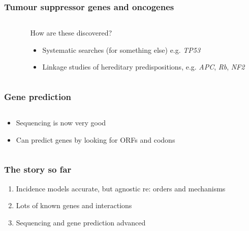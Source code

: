 {
\begin{frame}
    \frametitle{Tumour suppressor genes and oncogenes}
    \begin{columns}
        \begin{column}{0.5\textwidth}
        \end{column}
        \begin{column}{0.5\textwidth}
        How are these discovered?

        \begin{itemize}
            \item Systematic searches (for something else) e.g. \emph{TP53}
            \item Linkage studies of hereditary predispositions, e.g.
            \emph{APC}, \emph{Rb}, \emph{NF2}
        \end{itemize}
        \end{column}
    \end{columns}
\end{frame}

\begin{frame}
    \frametitle{Gene prediction}
    \begin{columns}
        \begin{column}{0.5\textwidth}
        \begin{itemize}
            \item Sequencing is now very good
            \item Can predict genes by looking for ORFs and codons
        \end{itemize}
        \end{column}
        \begin{column}{0.5\textwidth}
        \end{column}
    \end{columns}
\end{frame}

\begin{frame}
    \frametitle{The story so far}
    \begin{enumerate}
        \item Incidence models accurate, but agnostic re: orders and mechanisms
        \item Lots of known genes and interactions
        \item Sequencing and gene prediction advanced
    \end{enumerate}


\end{frame}}
